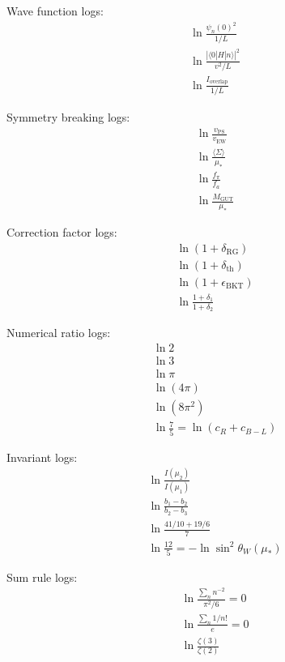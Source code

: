 \documentclass[11pt,a4paper]{article}
\begin{document}
Wave function logs:
\begin{align}
\label{eq:log-wf-1} &\ln\frac{\psi_n(0)^2}{1/L} \\
\label{eq:log-wf-2} &\ln\frac{|\langle 0|H|n\rangle|^2}{v^2/L} \\
\label{eq:log-wf-3} &\ln\frac{I_{\text{overlap}}}{1/L}
\end{align}

Symmetry breaking logs:
\begin{align}
\label{eq:log-sb-1} &\ln\frac{v_{\text{PS}}}{v_{\text{EW}}} \\
\label{eq:log-sb-2} &\ln\frac{\langle\Sigma\rangle}{\mu_*} \\
\label{eq:log-sb-3} &\ln\frac{f_{\pi}}{f_a} \\
\label{eq:log-sb-4} &\ln\frac{M_{\text{GUT}}}{\mu_*}
\end{align}

Correction factor logs:
\begin{align}
\label{eq:log-corr-1} &\ln(1 + \delta_{\text{RG}}) \\
\label{eq:log-corr-2} &\ln(1 + \delta_{\text{th}}) \\
\label{eq:log-corr-3} &\ln(1 + \epsilon_{\text{BKT}}) \\
\label{eq:log-corr-4} &\ln\frac{1 + \delta_1}{1 + \delta_2}
\end{align}

Numerical ratio logs:
\begin{align}
\label{eq:log-num-1} &\ln 2 \\
\label{eq:log-num-2} &\ln 3 \\
\label{eq:log-num-3} &\ln\pi \\
\label{eq:log-num-4} &\ln(4\pi) \\
\label{eq:log-num-5} &\ln(8\pi^2) \\
\label{eq:log-num-6} &\ln\frac{7}{5} = \ln(c_R + c_{B-L})
\end{align}

Invariant logs:
\begin{align}
\label{eq:log-inv-1} &\ln\frac{I(\mu_2)}{I(\mu_1)} \\
\label{eq:log-inv-2} &\ln\frac{b_1 - b_2}{b_2 - b_3} \\
\label{eq:log-inv-3} &\ln\frac{41/10 + 19/6}{7} \\
\label{eq:log-inv-4} &\ln\frac{12}{5} = -\ln\sin^2\theta_W(\mu_*)
\end{align}

Sum rule logs:
\begin{align}
\label{eq:log-sum-1} &\ln\frac{\sum_n n^{-2}}{\pi^2/6} = 0 \\
\label{eq:log-sum-2} &\ln\frac{\sum_n 1/n!}{e} = 0 \\
\label{eq:log-sum-3} &\ln\frac{\zeta(3)}{\zeta(2)}
\end{align}
\end{document}
